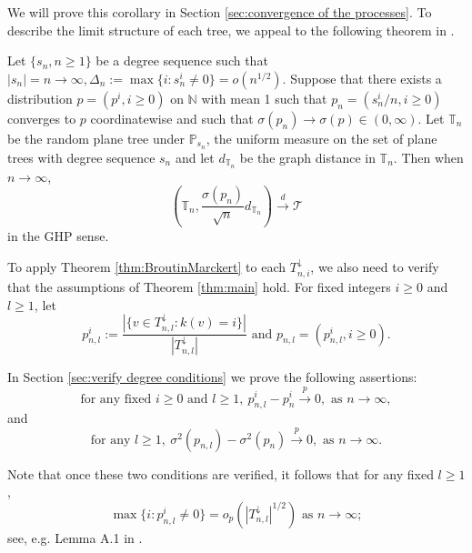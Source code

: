We will prove this corollary in Section \ref{sec:convergence of the processes}.
To describe the limit structure of each tree, we appeal to the following theorem in \cite{BroutinMarckert2014}.

\begin{thm}\label{thm:BroutinMarckert}
Let $\{s_n, n\ge 1\}$ be a degree sequence such that $|s_n|=n\rightarrow\infty, \Delta_n:=\max\{i: s^i_n\neq 0\}=o(n^{1/2})$. Suppose that there exists a distribution $p=(p^i, i\ge 0)$ on $\mathbb{N}$ with mean 1 such that $p_n=(s^i_n/n, i\ge 0)$ converges to $p$ coordinatewise and such that $\sigma(p_n)\rightarrow\sigma(p)\in(0,\infty)$. Let $\mathbb{T}_n$ be the random plane tree under $\mathbb{P}_{s_n}$, the uniform measure on the set of plane trees with degree sequence $s_n$ and let $d_{\mathbb{T}_n}$ be the graph distance in $\mathbb{T}_n$. Then when $n\to\infty$, \[(\mathbb{T}_n, \frac{\sigma(p_n)}{\sqrt{n}}d_{\mathbb{T}_n})\overset{d}{\to}\mathcal{T}\] in the GHP sense. 
\end{thm}


To apply Theorem \ref{thm:BroutinMarckert} to each $T^\downarrow_{n,i}$, we also need to verify that the assumptions of Theorem \ref{thm:main} hold. 
For fixed integers $i\ge 0$ and $l \ge 1$, let \[p^i_{n,l}:=\frac{|\{v\in T^\downarrow_{n,l}:k(v)=i\}|}{|T^\downarrow_{n,l}|} \mbox{ and } p_{n,l}=(p^i_{n,l}, i\ge 0).\]

In Section \ref{sec:verify degree conditions} we prove the following assertions:
\begin{equation}\label{eqn:degree proportion converge} 
\mbox{for any fixed } i\ge 0\mbox{ and }l\ge 1,\ p^i_{n,l}-p^i_n\overset{p}{\to}0, \mbox{ as } n\to\infty,
\end{equation}
and
\begin{equation}\label{eqn: sigma square converge}
\mbox{for any } l\ge 1, \ \sigma^2(p_{n,l})-\sigma^2(p_n)\overset{p}{\to} 0, \mbox{ as } n\to\infty.
\end{equation}

Note that once these two conditions are verified, it follows that for any fixed $l\ge 1$, \[\max\{i: p^i_{n,l}\neq 0\}=o_p(|T^\downarrow_{n,l}|^{1/2})\mbox{ as } n\to\infty;\] see, e.g. Lemma A.1 in \cite{Lei2017+}.

